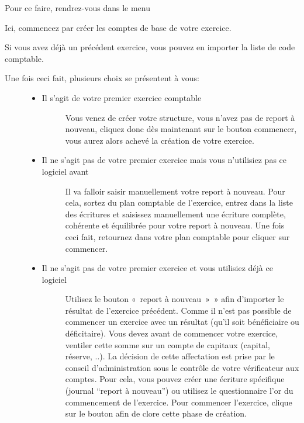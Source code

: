 \documentclass[a4paper,10pt,oneside,french]{sphinxmanual}
\begin{document}
Pour ce faire, rendrez-vous dans le menu 
\begin{quote}

\noindent{}
\end{quote}

Ici, commencez par créer les comptes de base de votre exercice.

Si vous avez déjà un précédent exercice, vous pouvez en importer la liste de code comptable.
\begin{description}
\item[{Une fois ceci fait, plusieurs choix se présentent à vous:}] \leavevmode\begin{itemize}
\item {} \begin{description}
\item[{Il s’agit de votre premier exercice comptable}] \leavevmode
Vous venez de créer votre structure, vous n’avez pas de report à nouveau, cliquez donc dès maintenant sur le bouton commencer, vous aurez alors achevé la création de votre exercice.

\end{description}

\item {} \begin{description}
\item[{Il ne s’agit pas de votre premier exercice mais vous n’utilisiez pas ce logiciel avant}] \leavevmode
Il va falloir saisir manuellement votre report à nouveau.
Pour cela, sortez du plan comptable de l’exercice, entrez dans la liste des écritures et saisissez manuellement une écriture complète, cohérente et équilibrée pour votre report à nouveau.
Une fois ceci fait, retournez dans votre plan comptable pour cliquer sur commencer.

\end{description}

\item {} \begin{description}
\item[{Il ne s’agit pas de votre premier exercice et vous utilisiez déjà ce logiciel}] \leavevmode
Utilisez le bouton « report à nouveau » » afin d’importer le résultat de l’exercice précédent.
Comme il n’est pas possible de commencer un exercice avec un résultat (qu’il soit bénéficiaire ou déficitaire).
Vous devez avant de commencer votre exercice, ventiler cette somme sur un compte de capitaux (capital, réserve, ..).
La décision de cette affectation est prise par le conseil d’administration sous le contrôle de votre vérificateur aux comptes.
Pour cela, vous pouvez créer une écriture spécifique (journal “report à nouveau”) ou utilisez le questionnaire l’or du commencement de l’exercice.
Pour commencer l’exercice, clique sur le bouton afin de clore cette phase de création.

\end{description}

\end{itemize}

\end{description}
\end{document}
